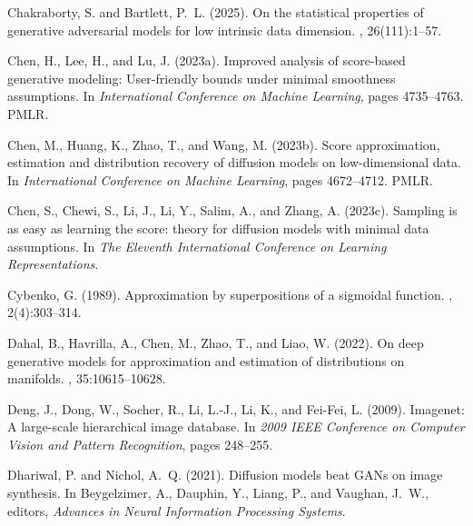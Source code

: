 \documentclass[12pts]{article}
\begin{document}
\begin{thebibliography}{}
Chakraborty, S. and Bartlett, P.~L. (2025).
\newblock On the statistical properties of generative adversarial models for low intrinsic data dimension.
, 26(111):1--57.

Chen, H., Lee, H., and Lu, J. (2023a).
\newblock Improved analysis of score-based generative modeling: User-friendly bounds under minimal smoothness assumptions.
\newblock In {\em International Conference on Machine Learning}, pages 4735--4763. PMLR.

Chen, M., Huang, K., Zhao, T., and Wang, M. (2023b).
\newblock Score approximation, estimation and distribution recovery of diffusion models on low-dimensional data.
\newblock In {\em International Conference on Machine Learning}, pages 4672--4712. PMLR.

Chen, S., Chewi, S., Li, J., Li, Y., Salim, A., and Zhang, A. (2023c).
\newblock Sampling is as easy as learning the score: theory for diffusion models with minimal data assumptions.
\newblock In {\em The Eleventh International Conference on Learning Representations}.

Cybenko, G. (1989).
\newblock Approximation by superpositions of a sigmoidal function.
, 2(4):303--314.

Dahal, B., Havrilla, A., Chen, M., Zhao, T., and Liao, W. (2022).
\newblock On deep generative models for approximation and estimation of distributions on manifolds.
, 35:10615--10628.

Deng, J., Dong, W., Socher, R., Li, L.-J., Li, K., and Fei-Fei, L. (2009).
\newblock Imagenet: A large-scale hierarchical image database.
\newblock In {\em 2009 IEEE Conference on Computer Vision and Pattern Recognition}, pages 248--255.

Dhariwal, P. and Nichol, A.~Q. (2021).
\newblock Diffusion models beat {GAN}s on image synthesis.
\newblock In Beygelzimer, A., Dauphin, Y., Liang, P., and Vaughan, J.~W., editors, {\em Advances in Neural Information Processing Systems}.


\end{thebibliography}
\end{document}
